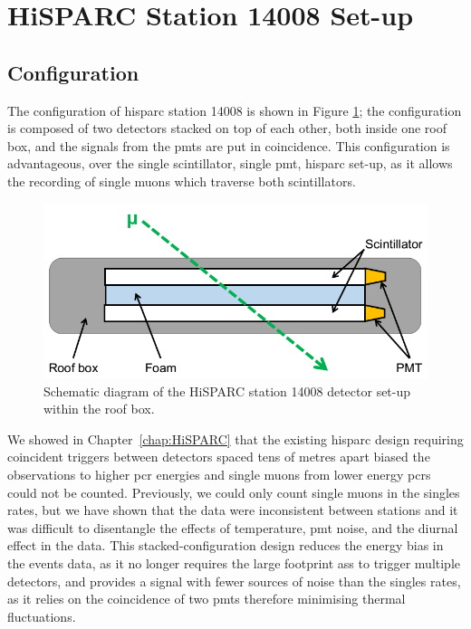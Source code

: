 \section{HiSPARC Station 14008 Set-up}\label{sec:HiSPARC_14008}


\subsection{Configuration}

The configuration of \gls{hisparc} station 14008 is shown in Figure \ref{fig:14008_config}; the configuration is composed of two detectors stacked on top of each other, both inside one roof box, and the signals from the \glspl{pmt} are put in coincidence. This configuration is advantageous, over the single scintillator, single \gls{pmt}, \gls{hisparc} set-up, as it allows the recording of single muons which traverse both scintillators. 


\begin{figure}[ht!]
	\center
	\includegraphics[width=0.75\columnwidth]{14008_config.png}
	\caption{Schematic diagram of the HiSPARC station 14008 detector set-up within the roof box.}
	\label{fig:14008_config}
\end{figure}

We showed in Chapter~\ref{chap:HiSPARC} that the existing \gls{hisparc} design requiring coincident triggers between detectors spaced tens of metres apart biased the observations to higher \gls{pcr} energies and single muons from lower energy \glspl{pcr} could not be counted. Previously, we could only count single muons in the singles rates, but we have shown that the data were inconsistent between stations and it was difficult to disentangle the effects of temperature, \gls{pmt} noise, and the diurnal effect in the data. This stacked-configuration design reduces the energy bias in the events data, as it no longer requires the large footprint \glspl{as} to trigger multiple detectors, and provides a signal with fewer sources of noise than the singles rates, as it relies on the coincidence of two \glspl{pmt} therefore minimising thermal fluctuations.

